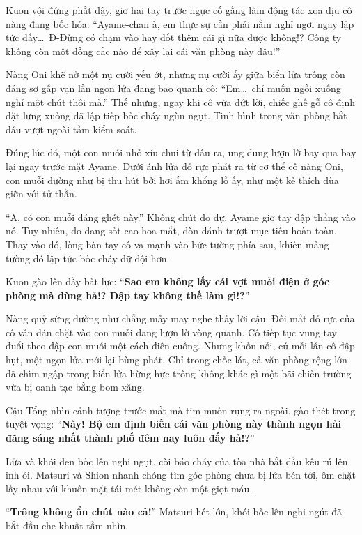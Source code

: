 \documentclass[../main.tex]{subfiles}
\begin{document}
Kuon vội đứng phắt dậy, giơ hai tay trước ngực cố gắng làm động tác xoa dịu cô nàng đang bốc hỏa: ``Ayame-chan à, em thực sự cần phải nằm nghỉ ngơi ngay lập tức đấy\dots\ Đ-Đừng có chạm vào hay đốt thêm cái gì nữa được không!? Công ty không còn một đồng cắc nào để xây lại cái văn phòng này đâu!''

Nàng Oni khẽ nở một nụ cười yếu ớt, nhưng nụ cười ấy giữa biển lửa trông còn đáng sợ gấp vạn lần ngọn lửa đang bao quanh cô: ``Em\dots\ chỉ muốn ngồi xuống nghỉ một chút thôi mà.'' Thế nhưng, ngay khi cô vừa dứt lời, chiếc ghế gỗ cô định đặt lưng xuống đã lập tiếp bốc cháy ngùn ngụt. Tình hình trong văn phòng bắt đầu vượt ngoài tầm kiểm soát.

Đúng lúc đó, một con muỗi nhỏ xíu chui từ đâu ra, ung dung lượn lờ bay qua bay lại ngay trước mặt Ayame. Dưới ánh lửa đỏ rực phát ra từ cơ thể cô nàng Oni, con muỗi dường như bị thu hút bởi hơi ấm khổng lồ ấy, như một kẻ thích đùa giỡn với tử thần.

``A, có con muỗi đáng ghét này.'' Không chút do dự, Ayame giơ tay đập thẳng vào nó. Tuy nhiên, do đang sốt cao hoa mắt, đòn đánh trượt mục tiêu hoàn toàn. Thay vào đó, lòng bàn tay cô va mạnh vào bức tường phía sau, khiến mảng tường đó lập tức bốc cháy dữ dội hơn.


Kuon gào lên đầy bất lực: ``\textbf{Sao em không lấy cái vợt muỗi điện ở góc phòng mà dùng hả!? Đập tay không thế làm gì!?}''

Nàng quỷ sừng dường như chẳng mảy may nghe thấy lời cậu. Đôi mắt đỏ rực của cô vẫn dán chặt vào con muỗi đang lượn lờ vòng quanh. Cô tiếp tục vung tay đuổi theo đập con muỗi một cách điên cuồng. Nhưng khốn nỗi, cứ mỗi lần cô đập hụt, một ngọn lửa mới lại bùng phát. Chỉ trong chốc lát, cả văn phòng rộng lớn đã chìm ngập trong biển lửa hừng hực trông không khác gì một bãi chiến trường vừa bị oanh tạc bằng bom xăng.

Cậu Tổng nhìn cảnh tượng trước mắt mà tim muốn rụng ra ngoài, gào thét trong tuyệt vọng: ``\textbf{Này! Bộ em định biến cái văn phòng này thành ngọn hải đăng sáng nhất thành phố đêm nay luôn đấy hả!?}''

Lửa và khói đen bốc lên nghi ngụt, còi báo cháy của tòa nhà bắt đầu kêu rú lên inh ỏi. Matsuri và Shion nhanh chóng tìm góc phòng chưa bị lửa bén tới, ôm chặt lấy nhau với khuôn mặt tái mét không còn một giọt máu.

``\textbf{Trông không ổn chút nào cả!}'' Matsuri hét lớn, khói bốc lên nghi ngút đã bắt đầu che khuất tầm nhìn.
\end{document}
